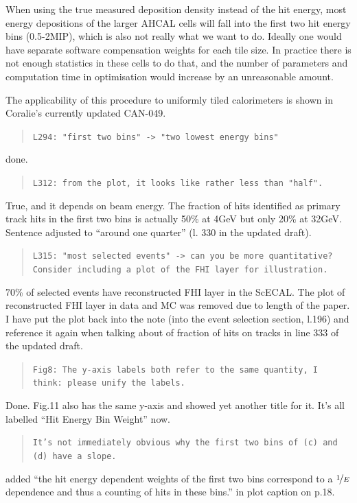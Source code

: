 \documentclass[twoside,a4paper,12pt]{article}
\begin{document}
 When using the true measured deposition density instead of the hit energy, most energy depositions of the larger AHCAL cells will fall into the first two hit energy bins (0.5-2MIP), which is also not really what we want to do. Ideally one would have separate software compensation weights for each tile size. In practice there is not enough statistics in these cells to do that, and the number of parameters and computation time in optimisation would increase by an unreasonable amount.

The applicability of this procedure to uniformly tiled calorimeters is shown in Coralie's currently updated CAN-049.
  
\begin{quote}\texttt{L294: "first two bins" -> "two lowest energy bins"}\end{quote}
done.

\begin{quote}\texttt{L312: from the plot, it looks like rather less than "half".}\end{quote}
True, and it depends on beam energy. The fraction of hits identified as primary track hits in the first two bins is actually 50\% at 4GeV but only 20\% at 32GeV. Sentence adjusted to ``around one quarter'' (l. 330 in the updated draft).

\begin{quote}\texttt{L315: "most selected events" -> can you be more quantitative? 
Consider including a plot of the FHI layer for illustration.}\end{quote}
70\% of selected events have reconstructed FHI layer in the ScECAL. The plot of reconstructed FHI layer in data and MC was removed due to length of the paper. I have put the plot back into the note (into the event selection section, l.196) and reference it again when talking about of fraction of hits on tracks in line 333 of the updated draft.

\begin{quote}\texttt{Fig8: The y-axis labels both refer to the same quantity, I think: please unify the labels.}\end{quote}
Done. Fig.11 also has the same y-axis and showed yet another title for it. It's all labelled ``Hit Energy Bin Weight'' now. 

\begin{quote}\texttt{It's not immediately obvious why the first two bins of (c) and (d) have a slope.}\end{quote}
added ``the hit energy dependent weights of the first two bins correspond to a $\nicefrac{1}{E}$ dependence and thus a counting of hits in these bins.'' in plot caption on p.18.
 
\end{document}
